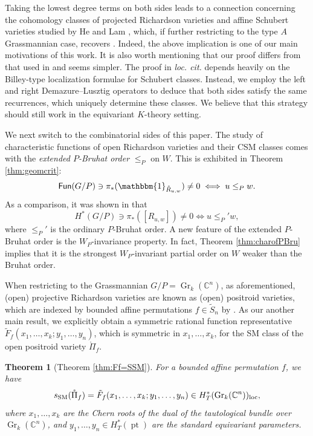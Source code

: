 \documentclass[12pt]{amsart}
\newtheorem{Thm}{Theorem}[section]
\def\SSM{s_{\rm SM}}
\def\Gr{\operatorname{Gr}}
\def\pt{\operatorname{pt}}
\def\Gr{\operatorname{Gr}}
\def\loc{\operatorname{loc}}
\begin{document}
Taking the lowest degree terms on both sides leads to a connection concerning the cohomology classes of   projected Richardson varieties and   affine Schubert varieties studied by He and Lam \cite[Theorem 5.8]{HL15}, which, if further restricting to the type $A$ Grassmannian case, recovers  \cite[Theorem 7.8]{KLS-Posi}. 
Indeed, the above implication  is one of our main motivations of this work. It is also worth mentioning that our proof differs   from that  used in  \cite{HL15} and seems  simpler. The proof in \textit{loc. cit.} depends heavily on the Billey-type localization formulae for  Schubert classes. 
Instead, we employ the left and right Demazure--Lusztig operators to deduce that both sides satisfy the same recurrences, which uniquely determine these classes. We believe that this strategy should still work in the equivariant $K$-theory setting. 




We next switch to the combinatorial sides of this paper. The study of characteristic functions of open Richardson varieties and their CSM classes comes with the  \emph{extended $P$-Bruhat order} $\leq_P$ on $W$. This is exhibited  in Theorem \ref{thm:geomcrit}:
$$\mathsf{Fun}(G/P)\ni \pi_*(\mathbbm{1}_{\mathring{R}_{u,w}})\neq 0\iff u\leq_P w.$$
As a comparison, it was shown in 
\cite[Lemma 3.1 and Corollary 3.4]{KLS-Proj} that 
$$H^*(G/P)\ni \pi_*([R_{u,w}])\neq 0\iff u\leq_P'w,$$
where  $\leq_P'$ is the ordinary $P$-Bruhat order.  
A new feature of the extended $P$-Bruhat order is the  $W_P$-invariance property. 
In fact, Theorem \ref{thm:charofPBru} implies that it is the strongest $W_P$-invariant partial order on $W$ weaker than the Bruhat order. 

When restricting to the Grassmannian  $G/P=\Gr_k(\mathbb{C}^n)$,  as aforementioned, (open) projective Richardson varieties are  known as  (open) positroid varieties, which are indexed by bounded affine permutations $f\in \tilde{S}_n$ by \cite{KLS-Posi}. As our another main result, we explicitly obtain a symmetric rational function representative $\tilde{F}_f(x_1,\ldots,x_k;y_1,\ldots,y_n)$, which is symmetric in $x_1,\ldots, x_k$, for the SM class
 of the open positroid variety $\mathring{\Pi}_{f}$.

\begin{Thm}[Theorem \ref{thm:Ff=SSM}]\label{BB-BN}
For  a bounded affine permutation $f$, we have
$$\SSM(\mathring{\Pi}_{f})=
\tilde{F}_f(x_1,\ldots,x_k;y_1,\ldots,y_n)\in 
H_T^*(\Gr_k(\mathbb{C}^n))_{\loc},$$
where $x_1,\ldots,x_k$ are the Chern roots of the dual of the tautological bundle over $\Gr_k(\mathbb{C}^n)$, and $y_1,\ldots,y_n\in H_T^*(\pt)$ are the standard equivariant parameters. 
\end{Thm}
\end{document}
